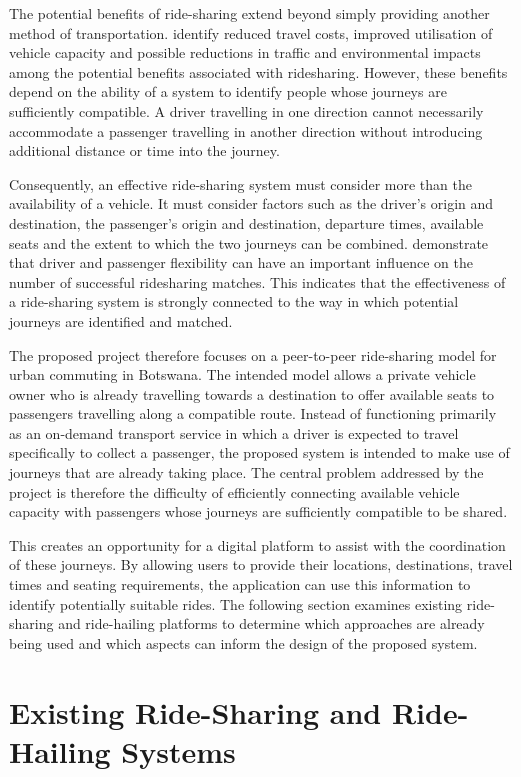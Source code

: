 The potential benefits of ride-sharing extend beyond simply providing another method of transportation. \citet{furuhata2013} identify reduced travel costs, improved utilisation of vehicle capacity and possible reductions in traffic and environmental impacts among the potential benefits associated with ridesharing. However, these benefits depend on the ability of a system to identify people whose journeys are sufficiently compatible. A driver travelling in one direction cannot necessarily accommodate a passenger travelling in another direction without introducing additional distance or time into the journey.

Consequently, an effective ride-sharing system must consider more than the availability of a vehicle. It must consider factors such as the driver's origin and destination, the passenger's origin and destination, departure times, available seats and the extent to which the two journeys can be combined. \citet{stiglic2016} demonstrate that driver and passenger flexibility can have an important influence on the number of successful ridesharing matches. This indicates that the effectiveness of a ride-sharing system is strongly connected to the way in which potential journeys are identified and matched.

The proposed project therefore focuses on a peer-to-peer ride-sharing model for urban commuting in Botswana. The intended model allows a private vehicle owner who is already travelling towards a destination to offer available seats to passengers travelling along a compatible route. Instead of functioning primarily as an on-demand transport service in which a driver is expected to travel specifically to collect a passenger, the proposed system is intended to make use of journeys that are already taking place. The central problem addressed by the project is therefore the difficulty of efficiently connecting available vehicle capacity with passengers whose journeys are sufficiently compatible to be shared.

This creates an opportunity for a digital platform to assist with the coordination of these journeys. By allowing users to provide their locations, destinations, travel times and seating requirements, the application can use this information to identify potentially suitable rides. The following section examines existing ride-sharing and ride-hailing platforms to determine which approaches are already being used and which aspects can inform the design of the proposed system.

\section{Existing Ride-Sharing and Ride-Hailing Systems}
\label{sec:existing}

